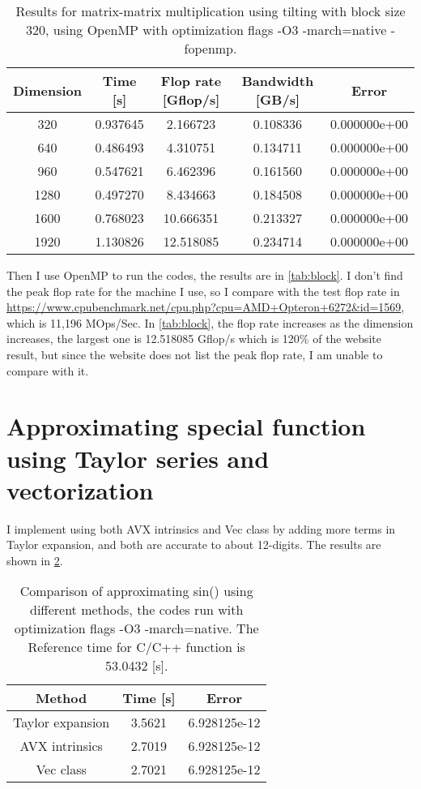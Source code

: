 \documentclass[10pt,a4paper]{article}
\theoremstyle{dotlessP}
\begin{document}
	\begin{table}[tbhp] 
	{\footnotesize
		\caption{Results for matrix-matrix multiplication using tilting with block size 320, using OpenMP with optimization flags -O3 -march=native -fopenmp.
		}\label{tab:omp}
		\begin{center}
			\begin{tabular}{ccccc}
				\hline 
				Dimension   &    Time [s] &  Flop rate [Gflop/s]     & Bandwidth  [GB/s] & Error\\ 
				\hline 
       320  &   0.937645  &   2.166723 &   0.108336 &  0.000000e+00\\ 
640  &   0.486493  &   4.310751 &   0.134711 &  0.000000e+00\\ 
960  &   0.547621  &   6.462396 &   0.161560 &  0.000000e+00\\ 
1280  &   0.497270  &   8.434663 &   0.184508 &  0.000000e+00\\ 
1600  &   0.768023  &  10.666351 &   0.213327 &  0.000000e+00\\ 
1920  &   1.130826  &  12.518085 &   0.234714 &  0.000000e+00\\ 
				\hline 
\end{tabular} 
\end{center}
}
\end{table}

Then I use OpenMP to run the codes, the results are in \cref{tab:block}. I don't find the peak flop rate for the machine I use, so I compare with the test flop rate in \url{https://www.cpubenchmark.net/cpu.php?cpu=AMD+Opteron+6272&id=1569}, which is 11,196 MOps/Sec. In \cref{tab:block}, the flop rate increases as the dimension increases, the largest one is 12.518085 Gflop/s which is 120\%
 of the website result, but since the website does not list the peak flop rate, I am unable to compare with it.
 
 \section{Approximating special function using Taylor series and vectorization}
 I implement using both AVX intrinsics and Vec class by adding more terms in Taylor expansion, and both are accurate to about 12-digits. The results are shown in \cref{tab:Taylor}.
 
 	\begin{table}[tbhp] 
 	{\footnotesize
 		\caption{Comparison of approximating sin() using different methods, the codes run with optimization flags -O3 -march=native. The Reference time for C/C++ function is  53.0432 [s].
 		}\label{tab:Taylor}
 		\begin{center}
\begin{tabular}{|c|c|c|}
	\hline 
Method	& Time [s] &  Error\\ 
	\hline 
Taylor expansion	&  3.5621 & 6.928125e-12 \\ \hline 
AVX intrinsics &  2.7019 & 	6.928125e-12\\ \hline 
Vec class&  2.7021   & 	 6.928125e-12\\ \hline 
\end{tabular} 
 		\end{center}
 	}
 \end{table}
 
\end{document}
